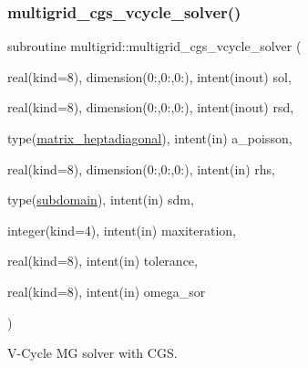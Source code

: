 \subsubsection{\texorpdfstring{multigrid\+\_\+cgs\+\_\+vcycle\+\_\+solver()}{multigrid\_cgs\_vcycle\_solver()}}
{\footnotesize\ttfamily subroutine multigrid\+::multigrid\+\_\+cgs\+\_\+vcycle\+\_\+solver (\begin{DoxyParamCaption}\item[{real(kind=8), dimension(0\+:,0\+:,0\+:), intent(inout)}]{sol,  }\item[{real(kind=8), dimension(0\+:,0\+:,0\+:), intent(inout)}]{rsd,  }\item[{type(\hyperlink{structmatrix_1_1matrix__heptadiagonal}{matrix\+\_\+heptadiagonal}), intent(in)}]{a\+\_\+poisson,  }\item[{real(kind=8), dimension(0\+:,0\+:,0\+:), intent(in)}]{rhs,  }\item[{type(\hyperlink{structgeometry_1_1subdomain}{subdomain}), intent(in)}]{sdm,  }\item[{integer(kind=4), intent(in)}]{maxiteration,  }\item[{real(kind=8), intent(in)}]{tolerance,  }\item[{real(kind=8), intent(in)}]{omega\+\_\+sor }\end{DoxyParamCaption})}



V-\/\+Cycle MG solver with C\+GS. 


